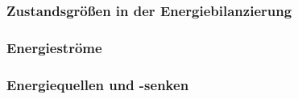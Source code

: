 \subsubsection{Zustandsgrößen in der Energiebilanzierung}




\subsubsection{Energieströme}


\subsubsection{Energiequellen und -senken}
